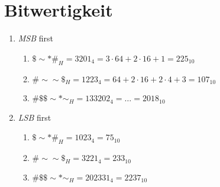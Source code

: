 \documentclass[a4paper]{article}
\begin{document}
\section{Bitwertigkeit}
\begin{enumerate}[label=\alph*)]
    \item \emph{MSB} first
        \begin{enumerate}[label=\Roman*)]
            \item $ \$\sim*\#_H = 3201_4 = 3 \cdot 64 + 2 \cdot 16 + 1 = 225_{10} $

            \item $ \#\sim\sim\$_H = 1223_4 = 64 + 2 \cdot 16 + 2 \cdot 4 + 3 = 107_{10} $

            \item $ \#\$\$\sim*\sim_H = 133202_4 = \dots = 2018_{10} $
        \end{enumerate}

    \item \emph{LSB} first
        \begin{enumerate}[label=\Roman*)]
            \item $ \$\sim*\#_H = 1023_4 = 75_{10} $

            \item $ \#\sim\sim\$_H = 3221_4 = 233_{10} $

            \item $ \#\$\$\sim*\sim_H = 202331_4 = 2237_{10} $
        \end{enumerate}
\end{enumerate}
\end{document}
